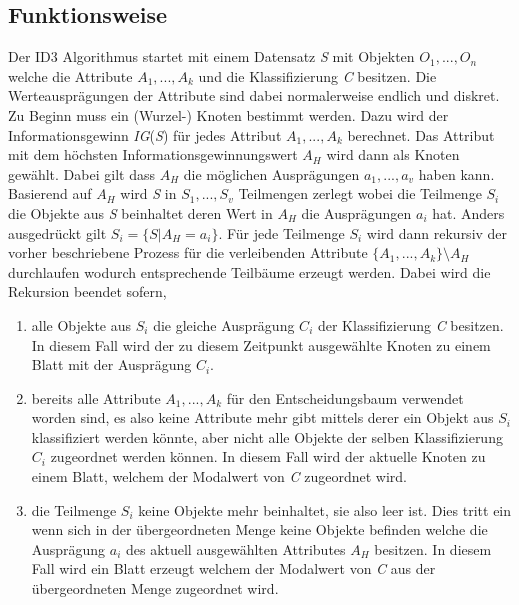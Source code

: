 \subsection{Funktionsweise}
Der ID3 Algorithmus startet mit einem Datensatz \textit{S} mit Objekten $O_{1},...,O_{n}$ welche die Attribute $A_{1},...,A_{k}$ und die Klassifizierung \textit{C} besitzen. \autocites{ImplementationID3}{QuinlanID3} Die Werteausprägungen der Attribute sind dabei normalerweise endlich und diskret. \autocite{ThailandID3}\\
Zu Beginn muss ein (Wurzel-) Knoten bestimmt werden. Dazu wird der Informationsgewinn \textit{IG}(\textit{S}) für jedes Attribut $A_{1},...,A_{k}$ berechnet. Das Attribut mit dem höchsten Informationsgewinnungswert $A_{H}$ wird dann als Knoten gewählt. Dabei gilt dass $A_{H}$ die möglichen Ausprägungen $a_{1},...,a_{v}$ haben kann. Basierend auf $A_{H}$ wird \textit{S} in $S_{1},...,S_{v}$ Teilmengen zerlegt wobei die Teilmenge $S_{i}$ die Objekte aus \textit{S} beinhaltet deren Wert in $A_{H}$ die Ausprägungen $a_{i}$ hat. Anders ausgedrückt gilt $S_{i} = \{S\vert A_{H} = a_{i}\}$. Für jede Teilmenge $S_{i}$ wird dann rekursiv der vorher beschriebene Prozess für die verleibenden Attribute $\{A_{1},...,A_{k}\}\setminus A_{H}$ durchlaufen wodurch entsprechende Teilbäume erzeugt werden. \Autocite{QuinlanID3} Dabei wird die Rekursion beendet sofern,

\begin{enumerate}
    \item alle Objekte aus $S_{i}$ die gleiche Ausprägung $C_{i}$ der Klassifizierung \textit{C} besitzen. In diesem Fall wird der zu diesem Zeitpunkt ausgewählte Knoten zu einem Blatt mit der Ausprägung $C_{i}$. \autocites{QuinlanID3}{PythonCourseDecisionTrees:online}{ID3algor15:online}
    \item bereits alle Attribute $A_{1},...,A_{k}$ für den Entscheidungsbaum verwendet worden sind, es also keine Attribute mehr gibt mittels derer ein Objekt aus $S_{i}$ klassifiziert werden könnte, aber nicht alle Objekte der selben Klassifizierung $C_{i}$ zugeordnet werden können. In diesem Fall wird der aktuelle Knoten zu einem Blatt, welchem der Modalwert von \textit{C} zugeordnet wird.\autocites{QuinlanID3}{PythonCourseDecisionTrees:online}{ID3algor15:online}
    \item die Teilmenge $S_{i}$ keine Objekte mehr beinhaltet, sie also leer ist. Dies tritt ein wenn sich in der übergeordneten Menge keine Objekte befinden welche die Ausprägung $a_{i}$ des aktuell ausgewählten Attributes $A_{H}$ besitzen. In diesem Fall wird ein Blatt erzeugt welchem der Modalwert von \textit{C} aus der übergeordneten Menge zugeordnet wird. \autocites{PythonCourseDecisionTrees:online}{ID3algor15:online}
\end{enumerate}

\pagebreak